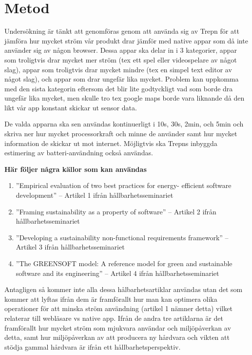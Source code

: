 \section{Metod}
\label{sec:joel_a-method}

Undersökning är tänkt att genomföras genom att använda sig av Trepn för att jämföra hur mycket ström vår produkt drar jämför med native appar som då inte använder sig av någon browser. Dessa appar ska delar in i 3 kategorier, appar som troligtvis drar mycket mer ström (tex ett spel eller videospelare av något slag), appar som troligtvis drar mycket mindre (tex en simpel text editor av något slag), och appar som drar ungefär lika mycket. Problem kan uppkomma med den sista kategorin eftersom det blir lite godtyckligt vad som borde dra ungefär lika mycket, men skulle tro tex google maps borde vara liknande då den likt vår app konstant skickar ut sensor data.

De valda apparna ska sen användas kontinuerligt i 10s, 30s, 2min, och 5min och skriva ner hur mycket processorkraft och minne de använder samt hur mycket information de skickar ut mot internet. Möjligtvis ska Trepns inbyggda estimering av batteri-användning också användas.

\textbf{Här följer några källor som kan användas}\\

\begin{enumerate}
	\item ''Empirical evaluation of two best practices for energy- efficient software development'' -- Artikel 1 ifrån hållbarhetsseminariet
	\item ''Framing sustainability as a property of software'' -- Artikel 2 ifrån hållbarhetsseminariet
	\item ''Developing a sustainability non-functional requirements framework'' -- Artikel 3 ifrån hållbarhetsseminariet
	\item ''The GREENSOFT model: A reference model for green and sustainable software and its engineering'' -- Artikel 4 ifrån hållbarhetsseminariet
\end{enumerate}

Antagligen så kommer inte alla dessa hålbarhetsartiklar användas utan det som kommer att lyftas ifrån dem är framförallt hur man kan optimera olika operationer för att minska ström användning (artikel 1 nämner detta) vilket relaterar till webläsare vs native app. Ifrån de andra tre artiklarna är det framförallt hur mycket ström som mjukvara användar och miljöpåverkan av detta, samt hur miljöpåverkan av att producera ny hårdvara och vikten att stödja gammal hårdvara är ifrån ett hållbarhetsperspektiv.
